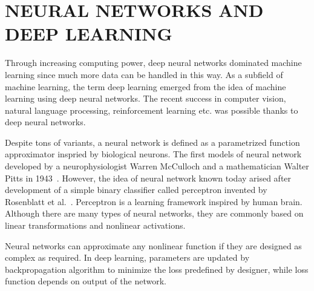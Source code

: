 \chapter{NEURAL NETWORKS AND DEEP LEARNING}
\label{chap:dnns}

Through increasing computing power, deep neural networks dominated machine learning since much more data can be handled in this way. 
As a subfield of machine learning, the term deep learning emerged from the idea of machine learning using deep neural networks. 
The recent success in computer vision, natural language processing, 
reinforcement learning etc. was possible thanks to deep neural networks. 

Despite tons of variants, a neural network is defined as a parametrized function approximator inspried by biological neurons. 
The first models of neural network developed by a neurophysiologist Warren McCulloch and a mathematician Walter Pitts in 1943~\cite{mcculloch_logical_1943}. 
However, the idea of neural network known today arised after development of a simple binary classifier called perceptron invented by Rosenblatt et al.~\cite{rosenblatt_perceptron_1958}. 
Perceptron is a learning framework inspired by human brain. Although there are many types of neural networks, 
they are commonly based on linear transformations and nonlinear activations.

Neural networks can approximate any nonlinear function if they are designed as complex as required. 
In deep learning, parameters are updated by backpropagation algorithm to minimize the loss predefined by designer, while loss function depends on output of the network.
